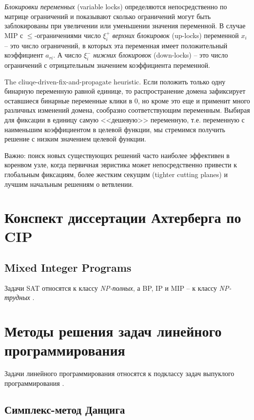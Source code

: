 \documentclass[%
	11pt,
	a4paper,
	utf8,
		]{article}
\begin{document}
\emph{Блокировки переменных} (variable locks) определяются непосредственно по матрице ограничений и показывают сколько ограничений могут быть заблокированы при увеличении или уменьшении значения переменной. В случае MIP с $ \leqslant $-ограничениями число $ \xi_i^{+} $ \emph{верхних блокировок} (up-locks) переменной $ x_i $ -- это число ограничений, в которых эта переменная имеет положительный коэффициент $ a_{ri} $. А число $ \xi_i^{-} $ \emph{нижних блокировок} (down-locks) -- это число ограничений с отрицательным значением коэффициента переменной.

The cliuqe-driven-fix-and-propagate heuristic. Если положить только одну бинарную переменную равной единице, то распространение домена зафиксирует оставшиеся бинарные переменные клики в 0, но кроме это еще и применит много различных изменений домена, сообразно соответствующим переменным. Выбирая для фиксации в единицу самую <<дешевую>> переменную, т.е. переменную с наименьшим коэффициентом в целевой функции, мы стремимся получить решение с низким значением целевой функции.

Важно: поиск новых существующих решений часто наиболее эффективен в коренвом узле, когда первичная эвристика может непосредственно привести к глобальным фиксациям, более жестким секущим (tighter cutting planes) и лучшим начальным решениям о ветвлении.


\section{Конспект диссертации Ахтерберга по CIP}

\subsection{Mixed Integer Programs}

Задачи SAT относятся к классу \emph{NP-полных}, а BP, IP и MIP -- к классу \emph{NP-трудных} \cite[]{achterberg:constr_int_prog}.

\section{Методы решения задач линейного программирования}

Задачи линейного программирования относятся к подклассу задач выпуклого программирования \cite[]{vorontsova:convex_opt-2021}.

\subsection{Симплекс-метод Данцига}
\end{document}

